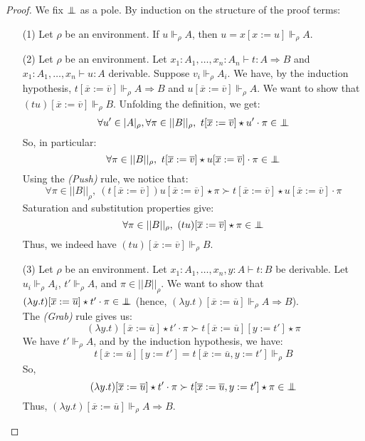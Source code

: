\documentclass[a4paper,12pt]{article}
\theoremstyle{rmqstyle}
\newcommand{\abs}[1]{\lvert#1\rvert}
\newcommand{\abss}[1]{\lvert \lvert#1\rvert \rvert}
\renewcommand{\implies}{\Rightarrow}
\newcommand{\pole}{{\protect\mathpalette{\protect\polehelper}{\bot}}} \def\polehelper#1#2{\mathrel{\rlap{$#1#2$}\mkern3mu{#1#2}}}
\renewcommand{\bar}{\overline}
\begin{document}
\begin{proof}
We fix $\pole$ as a pole. By induction on the structure of the proof terms:
\begin{itemize}
\setlength\itemsep{ -1 em}
\item[(1)] Let $\rho$ be an environment. If $u \Vdash_\rho A$, then $u = x[x := u] \Vdash_\rho A$.\\

\item[(2)] Let $\rho$ be an environment. Let $x_1 : A_1, \dots, x_n : A_n \vdash t : A \implies B$ and $x_1 : A_1, \dots, x_n \vdash u : A$ derivable. Suppose $v_i \Vdash_\rho A_i$. We have, by the induction hypothesis, $t[ \bar{x} := \bar{v}] \Vdash_\rho A \implies B$ and $u[\bar{x} := \bar{v}] \Vdash_\rho A$. We want to show that $(tu)[\bar{x} := \bar{v}] \Vdash_\rho B$. Unfolding the definition, we get:
$$\forall u' \in \abs{A}_\rho, \forall \pi \in \abss{B}_\rho, \ t[\bar{x} := \bar{v}] \star u' \cdot \pi \in \pole$$
So, in particular:
$$ \forall \pi \in \abss{B}_\rho, \ t[\bar{x} := \bar{v}] \star u[\bar{x} := \bar{v}] \cdot \pi \in \pole$$
Using the \textit{(Push)} rule, we notice that:
$$\forall \pi \in \abss{B}_\rho, \ (t[\bar{x} := \bar{v}])u[\bar{x} := \bar{v}] \star \pi \succ t[\bar{x} := \bar{v}] \star u[\bar{x} := \bar{v}] \cdot \pi$$
Saturation and substitution properties give:
$$\forall \pi \in \abss{B}_\rho, \ (tu)[\bar{x} := \bar{v}] \star \pi \in \pole$$
Thus, we indeed have $(tu)[\bar{x} := \bar{v}] \Vdash_\rho B$.\\

\item[(3)] Let $\rho$ be an environment. Let $x_1 : A_1, \dots, x_n, y : A \vdash t : B$ be derivable. Let $u_i \Vdash_\rho A_i$, $t' \Vdash_\rho A$, and $\pi \in \abss{B}_\rho$. We want to show that $(\lambda y.t)[\bar{x} := \bar{u}] \star t' \cdot \pi \in \pole$ (hence, $(\lambda y.t)[\bar{x} := \bar{u}] \Vdash_\rho A \implies B$).\\
The \textit{(Grab)} rule gives us:
$$(\lambda y.t)[\bar{x} := \bar{u}] \star t' \cdot \pi \succ  t[\bar{x} := \bar{u}][y := t'] \star \pi $$
We have $t' \Vdash_\rho A$, and by the induction hypothesis, we have:
$$t[\bar{x} := \bar{u}][y := t'] = t[\bar{x} := \bar{u}, y := t'] \Vdash_\rho B$$
So,
$$(\lambda y.t)[\bar{x} := \bar{u}] \star t' \cdot \pi \succ  t[\bar{x} := \bar{u}, y := t'] \star \pi \in \pole$$
Thus, $(\lambda y.t)[\bar{x} := \bar{u}] \Vdash_\rho A \implies B$.\\


\end{itemize}
\end{proof}
\end{document}
